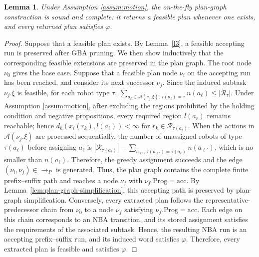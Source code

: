 \documentclass[lettersize,journal]{IEEEtran}
\theoremstyle{italiclemma}
\newtheorem{lemma}{Lemma}
\theoremstyle{italiclemma}
\theoremstyle{definition}
\begin{document}
\begin{lemma}\label{lem:initial-completeness}
Under Assumption \ref{assum:motion}, the on-the-fly plan-graph construction is sound and complete: it returns a feasible plan whenever one exists, and every returned plan satisfies $\varphi$.
\end{lemma}
\begin{proof}
Suppose that a feasible plan exists. By Lemma~\ref{l3}, a feasible accepting run is preserved after GBA pruning. We then show inductively that the corresponding feasible extensions are
preserved in the plan graph. The root node $\nu_0$ gives the base
case. Suppose that a feasible plan node $\nu_i$ on the accepting run
has been reached, and consider its next successor $\nu_j$. Since the
induced subtask $\nu_j.\xi$ is feasible, for each robot type $\tau$,
$\sum_{a_\ell\in\mathcal A(\nu_j.\xi),\,\tau(a_\ell)=\tau}
n(a_\ell)\leq |\mathcal R_\tau|$. Under Assumption \ref{assum:motion}, after excluding the regions prohibited by the holding condition and negative propositions, every required region $l(a_\ell)$ remains reachable; hence $d_k(x_i(r_k),l(a_\ell))<\infty$ for $r_k\in\mathcal R_{\tau(a_\ell)}$. When the actions in $\mathcal A(\nu_j.\xi)$ are processed sequentially, the number of unassigned robots of type $\tau(a_\ell)$ before assigning $a_\ell$ is $|\mathcal R_{\tau(a_\ell)}|-\sum_{a_{\ell'},\,\tau(a_{\ell'})=\tau(a_\ell)}n(a_{\ell'})$, which is no smaller than $n(a_\ell)$. Therefore, the greedy assignment succeeds and the edge $(\nu_i,\nu_j)\in\rightarrow_P$ is generated. Thus, the plan graph contains the complete finite prefix--suffix path and reaches a node $\nu_f$ with $\nu_f.\mathrm{Prog}=\mathrm{acc}$. By Lemma~\ref{lem:plan-graph-simplification}, this accepting path is preserved by plan-graph simplification.
Conversely, every extracted plan follows the representative-predecessor chain from $\nu_0$ to a node $\nu_f$ satisfying $\nu_f.\mathrm{Prog}=\mathrm{acc}$. Each edge on this chain corresponds to an NBA transition, and its stored assignment satisfies the requirements of the associated subtask. Hence, the resulting NBA run is an accepting prefix--suffix run, and its induced word satisfies $\varphi$. Therefore, every extracted plan is feasible and satisfies $\varphi$.

\end{proof}
\end{document}
